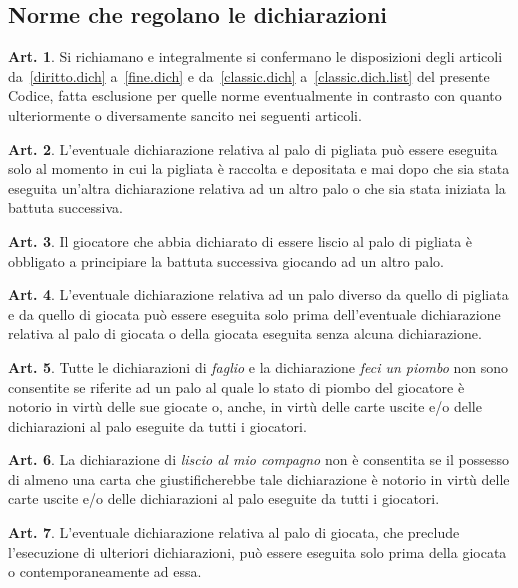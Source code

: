 \documentclass[italian,a4paper]{book}
\theoremstyle{definition}
\newtheorem{art}{Art.}
\begin{document}
\subsection{Norme che regolano le dichiarazioni}
\begin{art}
Si richiamano e integralmente si confermano le disposizioni degli articoli
da~\ref{diritto.dich} a~\ref{fine.dich} e da~\ref{classic.dich}
a~\ref{classic.dich.list} del presente Codice, fatta esclusione per quelle norme eventualmente in contrasto con quanto ulteriormente o diversamente sancito nei seguenti articoli.
\end{art}
\begin{art}
L'eventuale dichiarazione relativa al palo di pigliata può essere eseguita solo al momento in cui la pigliata è raccolta e depositata e mai dopo che sia stata eseguita un'altra dichiarazione relativa ad un altro palo o che sia stata iniziata la battuta successiva.
\end{art}
\begin{art}
Il giocatore che abbia dichiarato di essere liscio al palo di pigliata è obbligato a principiare la battuta successiva giocando ad un altro palo.
\end{art}
\begin{art}
L'eventuale dichiarazione relativa ad un palo diverso da quello di pigliata e da quello di giocata può essere eseguita solo prima dell'eventuale dichiarazione relativa al palo di giocata o della giocata eseguita senza alcuna dichiarazione.
\end{art}
\begin{art}
Tutte le dichiarazioni di \emph{faglio} e la dichiarazione \emph{feci un piombo} non sono consentite se riferite ad un palo al quale lo stato di piombo del giocatore è notorio in virtù delle sue giocate o, anche, in virtù delle carte uscite e/o delle dichiarazioni al palo eseguite da tutti i giocatori.
\end{art}
\begin{art}
La dichiarazione di \emph{liscio al mio compagno} non è consentita se il possesso di almeno una carta che giustificherebbe tale dichiarazione è notorio in virtù delle carte uscite e/o delle dichiarazioni al palo eseguite da tutti i giocatori.
\end{art}
\begin{art}
L'eventuale dichiarazione relativa al palo di giocata, che preclude l'esecuzione di ulteriori dichiarazioni, può essere eseguita solo prima della giocata o contemporaneamente ad essa.
\end{art}
\end{document}
